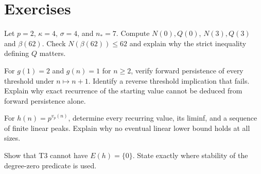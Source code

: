 \section{Exercises}
\begin{exercise}\label{tx:ex:period-arithmetic}
Let $p=2$, $\kappa=4$, $\sigma=4$, and $n_*=7$. Compute $N(0),Q(0)$,
$N(3),Q(3)$ and $\beta(62)$. Check $N(\beta(62))\le62$ and explain
why the strict inequality defining $Q$ matters.
\end{exercise}
\par\medskip

\begin{exercise}\label{tx:ex:forward-only}
For $g(1)=2$ and $g(n)=1$ for $n\ge2$, verify forward persistence of
every threshold under $n\mapsto n+1$. Identify a reverse threshold
implication that fails. Explain why exact recurrence of the starting
value cannot be deduced from forward persistence alone.
\end{exercise}
\par\medskip

\begin{exercise}\label{tx:ex:valuation-profile}
For $h(n)=p^{v_p(n)}$, determine every recurring value, its liminf,
and a sequence of finite linear peaks. Explain why no eventual linear
lower bound holds at all sizes.
\end{exercise}
\par\medskip

\begin{exercise}\label{tx:ex:zero-T3}
Show that T3 cannot have $E(h)=\{0\}$. State exactly where stability of
the degree-zero predicate is used.
\end{exercise}
\par\medskip

